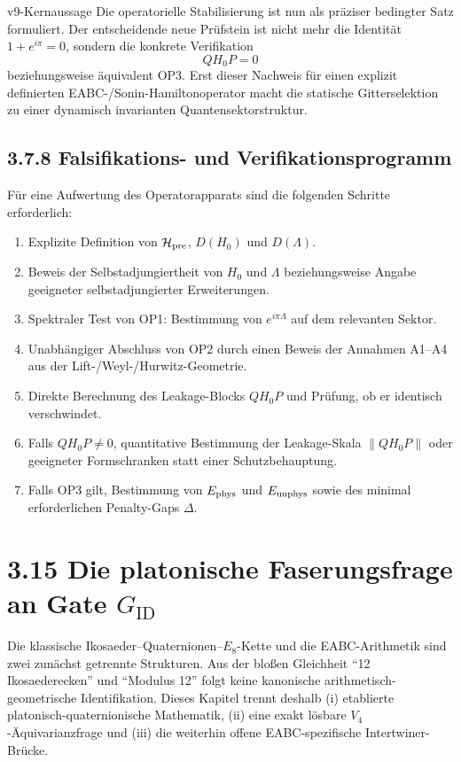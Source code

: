 \documentclass[11pt,a4paper]{article}
\begin{document}
\begin{statusbox}{v9-Kernaussage}
Die operatorielle Stabilisierung ist nun als präziser bedingter Satz formuliert. Der entscheidende neue Prüfstein ist nicht mehr die Identität $1+e^{i\pi}=0$, sondern die konkrete Verifikation
\[
\boxed{QH_0P=0}
\]
beziehungsweise äquivalent OP3. Erst dieser Nachweis für einen explizit definierten EABC-/Sonin-Hamiltonoperator macht die statische Gitterselektion zu einer dynamisch invarianten Quantensektorstruktur.
\end{statusbox}

\subsection*{3.7.8 Falsifikations- und Verifikationsprogramm}
Für eine Aufwertung des Operatorapparats sind die folgenden Schritte erforderlich:
\begin{enumerate}[leftmargin=1.6em]
\item Explizite Definition von $\mathcal H_{\rm pre}$, $D(H_0)$ und $D(\Lambda)$.
\item Beweis der Selbstadjungiertheit von $H_0$ und $\Lambda$ beziehungsweise Angabe geeigneter selbstadjungierter Erweiterungen.
\item Spektraler Test von OP1: Bestimmung von $e^{i\pi\Lambda}$ auf dem relevanten Sektor.
\item Unabhängiger Abschluss von OP2 durch einen Beweis der Annahmen A1--A4 aus der Lift-/Weyl-/Hurwitz-Geometrie.
\item Direkte Berechnung des Leakage-Blocks $QH_0P$ und Prüfung, ob er identisch verschwindet.
\item Falls $QH_0P\neq0$, quantitative Bestimmung der Leakage-Skala $\|QH_0P\|$ oder geeigneter Formschranken statt einer Schutzbehauptung.
\item Falls OP3 gilt, Bestimmung von $E_{\rm phys}$ und $E_{\rm unphys}$ sowie des minimal erforderlichen Penalty-Gaps $\Delta$.
\end{enumerate}



\newpage
\section*{3.15 Die platonische Faserungsfrage an Gate $G_{\mathrm{ID}}$}

\begin{warningbox}
Die klassische Ikosaeder--Quaternionen--$E_8$-Kette und die EABC-Arithmetik sind zwei zunächst getrennte Strukturen. Aus der bloßen Gleichheit ``12 Ikosaederecken'' und ``Modulus 12'' folgt keine kanonische arithmetisch-geometrische Identifikation. Dieses Kapitel trennt deshalb (i) etablierte platonisch-quaternionische Mathematik, (ii) eine exakt lösbare $V_4$-Äquivarianzfrage und (iii) die weiterhin offene EABC-spezifische Intertwiner-Brücke.
\end{warningbox}
\end{document}
